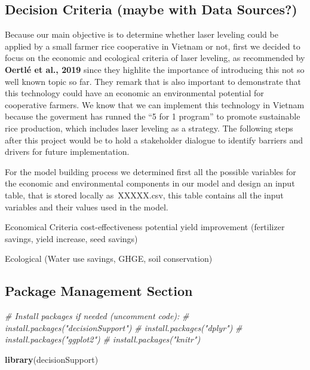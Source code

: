 \documentclass[
]{article}
\newenvironment{Shaded}{\begin{snugshade}}{\end{snugshade}}
\newcommand{\CommentTok}[1]{\textcolor[rgb]{0.56,0.35,0.01}{\textit{#1}}}
\newcommand{\FunctionTok}[1]{\textcolor[rgb]{0.13,0.29,0.53}{\textbf{#1}}}
\newcommand{\NormalTok}[1]{#1}
\begin{document}
\hypertarget{decision-criteria-maybe-with-data-sources}{%
\subsection{Decision Criteria (maybe with Data
Sources?)}\label{decision-criteria-maybe-with-data-sources}}

Because our main objective is to determine whether laser leveling could
be applied by a small farmer rice cooperative in Vietnam or not, first
we decided to focus on the economic and ecological criteria of laser
leveling, as recommended by \textbf{Oertlé et al., 2019} since they
highlite the importance of introducing this not so well known topic so
far. They remark that is also important to demonstrate that this
technology could have an economic an environmental potential for
cooperative farmers. We know that we can implement this technology in
Vietnam because the goverment has runned the ``5 for 1 program'' to
promote sustainable rice production, which includes laser leveling as a
strategy. The following steps after this project would be to hold a
stakeholder dialogue to identify barriers and drivers for future
implementation.

For the model building process we determined first all the possible
variables for the economic and environmental components in our model and
design an input table, that is stored locally as~XXXXX.csv, this table
contains all the input variables and their values used in the model.

Economical Criteria cost-effectiveness potential yield improvement
(fertilizer savings, yield increase, seed savings)

Ecological (Water use savings, GHGE, soil conservation)

\hypertarget{package-management-section}{%
\subsection{Package Management
Section}\label{package-management-section}}

\begin{Shaded}
\begin{Highlighting}[]
\CommentTok{\# Install packages if needed (uncomment code):}
\CommentTok{\# install.packages("decisionSupport")}
\CommentTok{\# install.packages("dplyr")}
\CommentTok{\# install.packages("ggplot2")}
\CommentTok{\# install.packages("knitr")}

\FunctionTok{library}\NormalTok{(decisionSupport)}
\end{Highlighting}
\end{Shaded}
\end{document}
